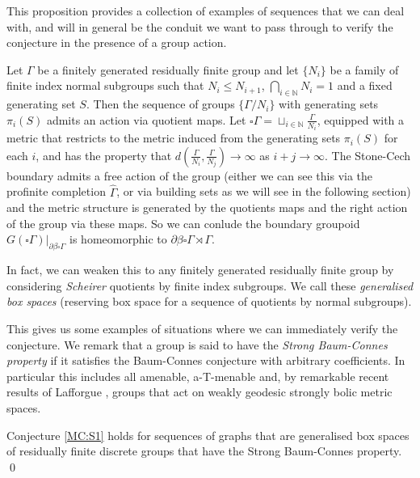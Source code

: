 This proposition provides a collection of examples of sequences that we can deal with, and will in general be the conduit we want to pass through to verify the conjecture in the presence of a group action.

\begin{example}
Let $\Gamma$ be a finitely generated residually finite group and let $\lbrace N_{i}\rbrace$ be a family of finite index normal subgroups such that $N_{i}\leq N_{i+1}$, $\bigcap_{i \in \mathbb{N}}N_{i}=1$ and a fixed generating set $S$. Then the sequence of groups $\lbrace \Gamma/N_{i}\rbrace$ with generating sets $\pi_{i}(S)$ admits an action via quotient maps. Let $\square\Gamma= \sqcup_{i \in \mathbb{N}}\frac{\Gamma}{N_{i}}$, equipped with a metric that restricts to the metric induced from the generating sets $\pi_{i}(S)$ for each $i$, and has the property that $d(\frac{\Gamma}{N_{i}},\frac{\Gamma}{N_{j}})\rightarrow \infty$ as $i+j \rightarrow \infty$. The Stone-Cech boundary admits a free action of the group (either we can see this via the profinite completion $\widehat{\Gamma}$, or via building sets as we will see in the following section) and the metric structure is generated by the quotients maps and the right action of the group via these maps. So we can conlude the boundary groupoid $G(\square\Gamma)|_{\partial \beta \square \Gamma}$ is homeomorphic to $\partial\beta\square\Gamma \rtimes \Gamma$.  
\end{example}

\begin{example}
In fact, we can weaken this to any finitely generated residually finite group by considering \textit{Scheirer} quotients by finite index subgroups. We call these \textit{generalised box spaces} (reserving box space for a sequence of quotients by normal subgroups).
\end{example}

This gives us some examples of situations where we can immediately verify the conjecture. We remark that a group is said to have the \textit{Strong Baum-Connes property} if it satisfies the Baum-Connes conjecture with arbitrary coefficients. In particular this includes all amenable, a-T-menable \cite{MR1487204} and, by remarkable recent results of Lafforgue \cite{lafforgue2012}, groups that act on weakly geodesic strongly bolic metric spaces.

\begin{theorem}
Conjecture \ref{MC:S1} holds for sequences of graphs that are generalised box spaces of residually finite discrete groups that have the Strong Baum-Connes property. \qed
\end{theorem}

